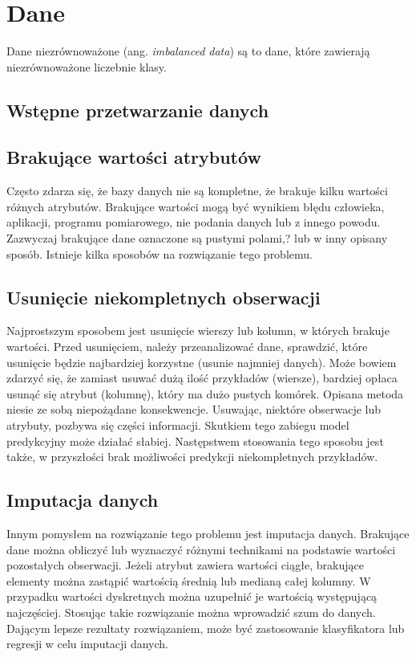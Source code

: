 \section{Dane}

Dane niezrównoważone (ang. \textit{imbalanced data}) są to dane, które zawierają niezrównoważone liczebnie klasy. 
\subsection{Wstępne przetwarzanie danych}
\subsection{Brakujące wartości atrybutów}
Często zdarza się, że bazy danych nie są kompletne, że brakuje kilku wartości różnych atrybutów. Brakujące wartości mogą być wynikiem błędu człowieka, aplikacji, programu pomiarowego, nie podania danych lub z innego powodu. Zazwyczaj brakujące dane oznaczone są pustymi polami,? lub w inny opisany sposób. Istnieje kilka sposobów na rozwiązanie tego problemu.
\subsection{Usunięcie niekompletnych obserwacji}
Najprostszym sposobem jest usunięcie wierszy lub kolumn, w których brakuje wartości. Przed usunięciem, należy przeanalizować dane, sprawdzić, które usunięcie będzie najbardziej korzystne (usunie najmniej danych). Może bowiem zdarzyć się, że zamiast usuwać dużą ilość przykładów (wiersze), bardziej opłaca usunąć się atrybut (kolumnę), który ma dużo pustych komórek. Opisana metoda niesie ze sobą niepożądane konsekwencje. Usuwając, niektóre obserwacje lub atrybuty, pozbywa się części informacji. Skutkiem tego zabiegu model predykcyjny może działać słabiej. Następstwem stosowania tego sposobu jest także, w przyszłości brak możliwości predykcji niekompletnych przykładów.
\subsection{Imputacja danych}
Innym pomysłem na rozwiązanie tego problemu jest imputacja danych. Brakujące dane można obliczyć lub wyznaczyć różnymi technikami na podstawie wartości pozostałych obserwacji. Jeżeli atrybut zawiera wartości ciągłe, brakujące elementy można zastąpić wartością średnią lub medianą całej kolumny. W przypadku wartości dyskretnych można uzupełnić je wartością występującą najczęściej. Stosując takie rozwiązanie można wprowadzić szum do danych. Dającym lepsze rezultaty rozwiązaniem, może być zastosowanie klasyfikatora lub regresji w celu imputacji danych.




